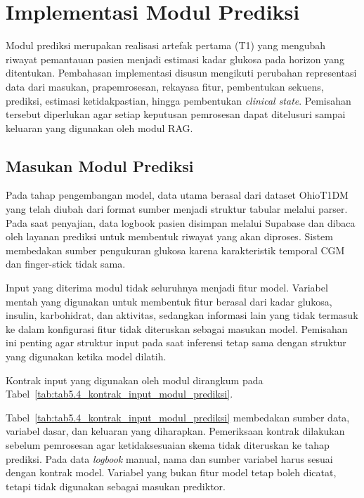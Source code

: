 \section{Implementasi Modul Prediksi}
\label{sec:bab5-implementasi-modul-prediksi}

Modul prediksi merupakan realisasi artefak pertama (T1) yang mengubah riwayat pemantauan pasien menjadi estimasi kadar glukosa pada horizon yang ditentukan.
Pembahasan implementasi disusun mengikuti perubahan representasi data dari masukan, prapemrosesan, rekayasa fitur, pembentukan sekuens, prediksi, estimasi ketidakpastian,
hingga pembentukan \textit{clinical state}. Pemisahan tersebut diperlukan agar setiap keputusan pemrosesan dapat ditelusuri sampai keluaran yang digunakan oleh modul RAG.

\subsection{Masukan Modul Prediksi}
\label{subsec:bab5-masukan-modul-prediksi}

Pada tahap pengembangan model, data utama berasal dari dataset OhioT1DM yang telah diubah dari format sumber menjadi struktur tabular melalui parser. Pada saat penyajian,
data logbook pasien disimpan melalui Supabase dan dibaca oleh layanan prediksi untuk membentuk riwayat yang akan diproses. Sistem membedakan sumber pengukuran glukosa
karena karakteristik temporal CGM dan finger-stick tidak sama.

Input yang diterima modul tidak seluruhnya menjadi fitur model. Variabel mentah yang digunakan untuk membentuk fitur berasal dari kadar glukosa, insulin, karbohidrat,
dan aktivitas, sedangkan informasi lain yang tidak termasuk ke dalam konfigurasi fitur tidak diteruskan sebagai masukan model. Pemisahan ini penting agar struktur input
pada saat inferensi tetap sama dengan struktur yang digunakan ketika model dilatih.

Kontrak input yang digunakan oleh modul dirangkum pada Tabel~\ref{tab:tab5.4_kontrak_input_modul_prediksi}.



Tabel~\ref{tab:tab5.4_kontrak_input_modul_prediksi} membedakan sumber data, variabel dasar, dan keluaran yang diharapkan. Pemeriksaan kontrak dilakukan sebelum pemrosesan
agar ketidaksesuaian skema tidak diteruskan ke tahap prediksi. Pada data \textit{logbook} manual, nama dan sumber variabel harus sesuai dengan kontrak model. Variabel yang bukan fitur model tetap boleh dicatat, tetapi tidak
digunakan sebagai masukan prediktor.

